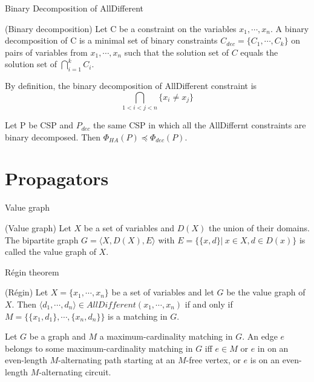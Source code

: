 \documentclass[10pt,aspectratio=43,mathserif]{beamer}
\begin{document}
    \begin{frame}{Binary Decomposition of AllDifferent}
        \begin{definition}
                        (Binary decomposition\cite{van2001alldifferent}) Let C be a constraint on the variables $x_1,\cdots,x_n$. A binary decomposition of C is a minimal set of binary constraints $C_{dec}=\{C_1,\cdots,C_k\}$ on pairs of variables from $x_1, \cdots, x_n$ such that the solution set of $C$ equals the solution set of $\bigcap_{i=1}^k C_i$.
        \end{definition}
        By definition, the binary decomposition of AllDifferent constraint is $$\bigcap_{1<i<j<n} \{x_i\neq x_j\} $$
    
        \begin{theorem}
           Let P be CSP and $P_{dec}$ the same CSP in which all the AllDiffernt constraints are binary decomposed. Then $\Phi_{HA}(P)\preceq \Phi_{dec}(P)$.
        \end{theorem}
    \end{frame}

\section{Propagators}
    \begin{frame}{Value graph}
        \begin{definition}
                (Value graph) Let $X$ be a set of variables and $D(X)$ the union of their domains. The bipartite graph $G=\langle X,D(X),E\rangle$ with $E=\{\{x,d\}|\ x\in X, d\in D(x)\}$ is called the value graph of $X$.
            \end{definition}
    \end{frame}

    \begin{frame}{Régin theorem}
        \begin{theorem}
                (Régin\cite{regin1994filtering}) Let $X=\{x_1,\cdots,x_n\}$ be a set of variables and let $G$ be the value graph of $X$. Then $\langle d_1,\cdots,d_n\rangle\in AllDifferent(x_1,\cdots,x_n)$ if and only if $M=\{\{x_1,d_1\},\cdots,\{x_n,d_n\}\}$ is a matching in $G$.
            \end{theorem}
            \begin{theorem}
                Let $G$ be a graph and $M$ a maximum-cardinality matching in $G$. An edge $e$ belongs to some maximum-cardinality matching in $G$ iff $e\in M$ or $e$ in on an even-length $M$-alternating path starting at an $M$-free vertex, or $e$ is on an even-length $M$-alternating circuit.
            \end{theorem}
    \end{frame}
\end{document}
